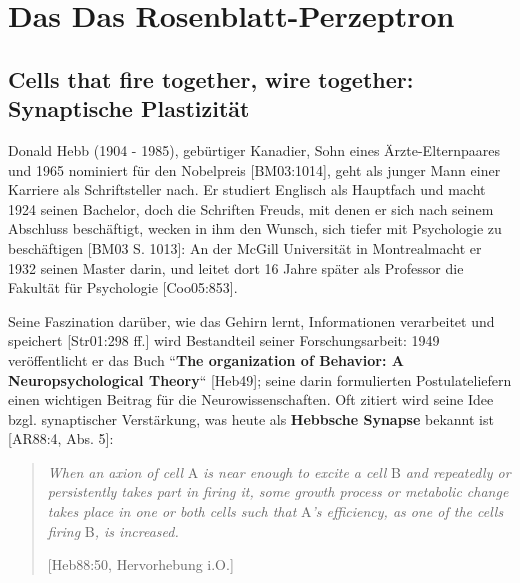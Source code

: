 \section{Das Das Rosenblatt-Perzeptron}


\subsection{Cells that fire together, wire together: Synaptische Plastizität}

Donald Hebb (1904 - 1985), gebürtiger Kanadier, Sohn eines Ärzte-Elternpaares und 1965 nominiert für den Nobelpreis [BM03:1014], geht als junger Mann einer Karriere als Schriftsteller nach.
Er studiert Englisch als Hauptfach und macht 1924 seinen Bachelor\footnotemark[1] [Coo05:852], doch die Schriften Freuds, mit denen er sich nach seinem Abschluss beschäftigt, wecken in ihm den Wunsch, sich tiefer mit Psychologie zu beschäftigen [BM03 S. 1013]: An der McGill Universität in Montreal\footnotemark[2] macht er 1932 seinen Master darin\footnotemark[3], und leitet dort 16 Jahre später als Professor die Fakultät für Psychologie [Coo05:853].



Seine Faszination darüber, wie das Gehirn lernt, Informationen verarbeitet und speichert [Str01:298 ff.] wird Bestandteil seiner Forschungsarbeit: 1949 veröffentlicht er das Buch ``\textbf{The organization of Behavior: A Neuropsychological Theory}`` [Heb49]; seine darin formulierten Postulate\footnotemark[4] [Kle99:2 f.] liefern einen wichtigen Beitrag für die Neurowissenschaften\footnotemark[5].
Oft zitiert wird seine Idee bzgl. synaptischer Verstärkung, was heute als \textbf{Hebbsche Synapse} bekannt ist [AR88:4, Abs. 5]\footnotemark[6]:

\blockquote[{[Heb88:50, Hervorhebung i.O.]}]{
    \textit{When an axion of cell} A \textit{is near enough to excite a cell} B \textit{and repeatedly or persistently takes part in firing it, some growth process or metabolic change takes place in one or both cells such that} A\textit{'s efficiency, as one of the cells firing} B\textit{, is increased.}
}

